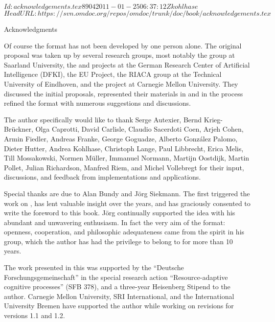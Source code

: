 \svnInfo $Id: acknowledgements.tex 8904 2011-01-25 06:37:12Z kohlhase $
\svnKeyword $HeadURL: https://svn.omdoc.org/repos/omdoc/trunk/doc/book/acknowledgements.tex $

\begin{omgroup}[display=flow]{Acknowledgments}

  \thispagestyle{empty} Of course the {\omdoc}
  format has not been developed by one person alone. The original proposal was taken up by
  several research groups, most notably the {\OMEGA} group at Saarland University, the
  {\maya} and {\activemath} projects at the German Research Center of Artificial
  Intelligence (DFKI), the {} EU Project, the RIACA group at the Technical
  University of Eindhoven, and the {} project at Carnegie Mellon
  University.  They discussed the initial proposals, represented their materials in
  {\omdoc} and in the process refined the format with numerous suggestions and
  discussions.

  The author specifically would like to thank Serge Autexier, Bernd Krieg-Br\"uckner, Olga
  Caprotti, David Carlisle, Claudio Sacerdoti Coen, Arjeh Cohen, Armin Fiedler, Andreas
  Franke, George Goguadze, Alberto Gonz\'alez Palomo, Dieter Hutter, Andrea Kohlhase,
  Christoph Lange, Paul Libbrecht, Erica Melis, Till Mossakowski, Normen M\"uller,
  Immanuel Normann, Martijn Oostdijk, Martin Pollet, Julian Richardson, Manfred Riem, and
  Michel Vollebregt for their input, discussions, and feedback from implementations and
  applications.

  Special thanks are due to Alan Bundy and J\"org Siekmann. The first triggered the work
  on {\omdoc}, has lent valuable insight over the years, and has graciously consented to
  write the foreword to this book. J\"org continually supported the {\omdoc} idea with his
  abundant and unwavering enthusiasm. In fact the very aim of the {\omdoc} format:
  openness, cooperation, and philosophic adequateness came from the spirit in his {\OMEGA}
  group, which the author has had the privilege to belong to for more than 10 years.

  The work presented in this {\report} was supported by the ``Deutsche
  For\-schungs\-gemeinschaft'' in the special research action ``Resource-adaptive
  cognitive processes'' (SFB 378), and a three-year Heisenberg Stipend to the author.
  Carnegie Mellon University, SRI International, and the International University Bremen
  have supported the author while working on revisions for versions 1.1 and 1.2.
\end{omgroup}

